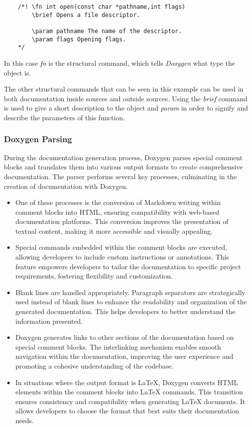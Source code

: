 \begin{verbatim}
    /*! \fn int open(const char *pathname,int flags)
        \brief Opens a file descriptor.

        \param pathname The name of the descriptor.
        \param flags Opening flags.
    */
\end{verbatim}

In this case \textit{fn} is the structural command, which tells \textit{Doxygen} what type the object is.\\
\vspace{\baselineskip}

The other structural commands that can be seen in this example can be used in both documentation inside sources and outside sources. Using the \textit{brief} command 
is used to give a short description to the object and \textit{param} in order to signify and describe the parameters of this function.\\

\subsubsection{Doxygen Parsing}

During the documentation generation process, Doxygen parses special comment blocks and translates them into various output formats to create comprehensive 
documentation. The parser performs several key processes, culminating in the creation of documentation with Doxygen.

\begin{itemize}
    \item[] One of these processes is the conversion of Markdown writing within comment blocks into HTML, ensuring compatibility with web-based documentation platforms. This conversion improves the presentation of textual content, making it more accessible and visually appealing.
    \item[] Special commands embedded within the comment blocks are executed, allowing developers to include custom instructions or annotations. This feature empowers developers to tailor the documentation to specific project requirements, fostering flexibility and customization.
    \item[] Blank lines are handled appropriately. Paragraph separators are strategically used instead of blank lines to enhance the readability and organization of the generated documentation. This helps developers to better understand the information presented.
    \item[] Doxygen generates links to other sections of the documentation based on special comment blocks. The interlinking mechanism enables smooth navigation within the documentation, improving the user experience and promoting a cohesive understanding of the codebase.
    \item[] In situations where the output format is LaTeX, Doxygen converts HTML elements within the comment blocks into LaTeX commands. This transition ensures consistency and compatibility when generating LaTeX documents. It allows developers to choose the format that best suits their documentation needs.
\end{itemize}

